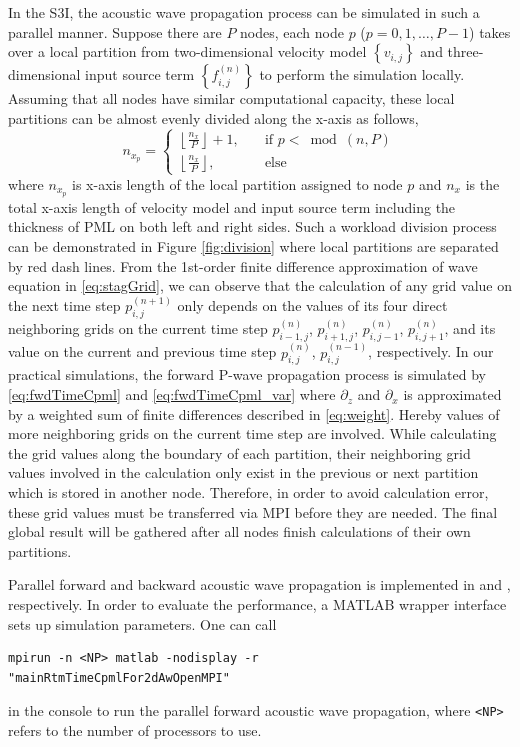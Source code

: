 \documentclass[11pt,titlepage]{article}
\theoremstyle{plain}
\theoremstyle{definition}
\theoremstyle{remark}
\numberwithin{equation}{section}
\begin{document}
In the S3I, the acoustic wave propagation process can be simulated in such a parallel manner. Suppose there are $P$ nodes, each node $p$ ($p=0, 1, \dots, P-1$) takes over a local partition from two-dimensional velocity model $\left\{v_{i,j}\right\}$ and three-dimensional input source term $\left\{f_{i,j}^{(n)}\right\}$ to perform the simulation locally. Assuming that all nodes have similar computational capacity, these local partitions can be almost evenly divided along the x-axis as follows, 
\begin{equation}
  \label{eq:mpiWorkDivision}
  n_{x_p} = \left\{
  \begin{aligned}
    \left\lfloor \frac{n_x}{P} \right\rfloor + 1, \quad &\text{if } p < \bmod(n, P) \\
    \left\lfloor \frac{n_x}{P} \right\rfloor, \quad &\text{else}
  \end{aligned}
  \right.
\end{equation}
where $n_{x_p}$ is x-axis length of the local partition assigned to node $p$ and $n_x$ is the total x-axis length of velocity model and input source term including the thickness of PML on both left and right sides. Such a workload division process can be demonstrated in Figure \ref{fig:division} where local partitions are separated by red dash lines. From the 1st-order finite difference approximation of wave equation in \eqref{eq:stagGrid}, we can observe that the calculation of any grid value on the next time step $p_{i,j}^{(n+1)}$ only depends on the values of its four direct neighboring grids on the current time step $p_{i-1,j}^{(n)}$, $p_{i+1,j}^{(n)}$, $p_{i,j-1}^{(n)}$, $p_{i,j+1}^{(n)}$, and its value on the current and previous time step $p_{i,j}^{(n)}$, $p_{i,j}^{(n-1)}$, respectively. In our practical simulations, the forward P-wave propagation process is simulated by \eqref{eq:fwdTimeCpml} and \eqref{eq:fwdTimeCpml_var} where $\partial_z$ and $\partial_x$ is approximated by a weighted sum of finite differences described in \eqref{eq:weight}. Hereby values of more neighboring grids on the current time step are involved. While calculating the grid values along the boundary of each partition, their neighboring grid values involved in the calculation only exist in the previous or next partition which is stored in another node. Therefore, in order to avoid calculation error, these grid values must be transferred via MPI before they are needed. The final global result will be gathered after all nodes finish calculations of their own partitions.

Parallel forward and backward acoustic wave propagation is implemented in  and , respectively. In order to evaluate the performance, a MATLAB wrapper interface  sets up simulation parameters. One can call 
\begin{lstlisting}[basicstyle=\ttfamily,keywordstyle=\color{blue}]
mpirun -n <NP> matlab -nodisplay -r
"mainRtmTimeCpmlFor2dAwOpenMPI"
\end{lstlisting}
in the console to run the parallel forward acoustic wave propagation, where \texttt{<NP>} refers to the number of processors to use.
\end{document}
